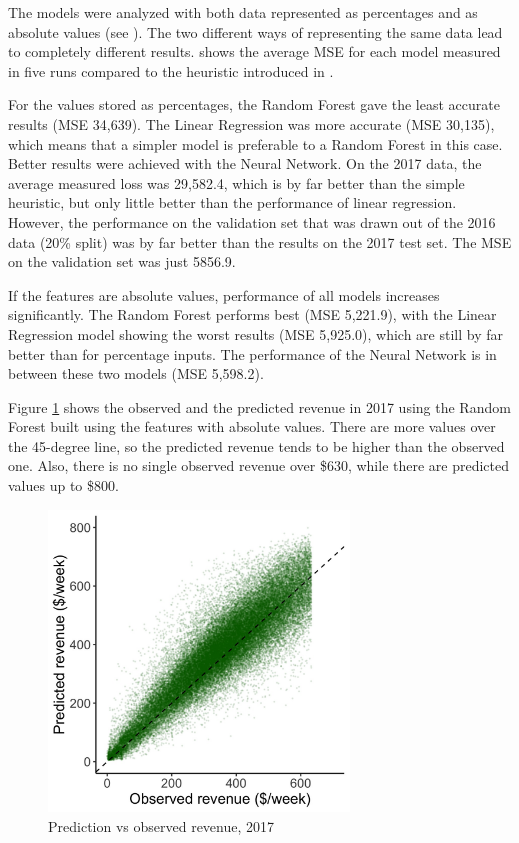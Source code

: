 \documentclass[twoside,11pt]{article}
\begin{document}
The models were analyzed with both data represented as percentages and as absolute values (see ). The two different ways of representing the same data lead to completely different results.  shows the average MSE for each model measured in five runs compared to the heuristic introduced in .\par

For the values stored as percentages, the Random Forest gave the least accurate results (MSE 34,639). The Linear Regression was more accurate (MSE 30,135), which means that a simpler model is preferable to a Random Forest in this case. Better results were achieved with the Neural Network. On the 2017 data, the average measured loss was 29,582.4, which is by far better than the simple heuristic, but only little better than the performance of linear regression. However, the performance on the validation set that was drawn out of the 2016 data (20\% split) was by far better than the results on the 2017 test set. The MSE on the validation set was just 5856.9.\par

If the features are absolute values, performance of all models increases significantly. The Random Forest performs best (MSE 5,221.9), with the Linear Regression model showing the worst results (MSE 5,925.0), which are still by far better than for percentage inputs. The performance of the Neural Network is in between these two models (MSE 5,598.2).

Figure \ref{fig:figure2} shows the observed and the predicted revenue in 2017 using the Random Forest built using the features with absolute values. There are more values over the 45-degree line, so the predicted revenue tends to be higher than the observed one. Also, there is no single observed revenue over \$630, while there are predicted values up to \$800. 

\begin{figure}[H]
  \begin{center}
    \includegraphics[height=8cm]{Plot_predicted_observed.jpg}
    \caption{Prediction vs observed revenue, 2017}
    \label{fig:figure2}
  \end{center}
\end{figure}
\end{document}
